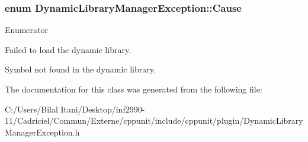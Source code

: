 \subsubsection[{\texorpdfstring{Cause}{Cause}}]{\setlength{\rightskip}{0pt plus 5cm}enum {\bf Dynamic\+Library\+Manager\+Exception\+::\+Cause}}\hypertarget{class_dynamic_library_manager_exception_a73b4694c152e0693fbc19fb04987a0b9}{}\label{class_dynamic_library_manager_exception_a73b4694c152e0693fbc19fb04987a0b9}
\begin{Desc}
\item[Enumerator]\par
\begin{description}
\item[{\em 
loading\+Failed\hypertarget{class_dynamic_library_manager_exception_a73b4694c152e0693fbc19fb04987a0b9a778b42fb996bf018bdc26934649cad63}{}\label{class_dynamic_library_manager_exception_a73b4694c152e0693fbc19fb04987a0b9a778b42fb996bf018bdc26934649cad63}
}]Failed to load the dynamic library. \item[{\em 
symbol\+Not\+Found\hypertarget{class_dynamic_library_manager_exception_a73b4694c152e0693fbc19fb04987a0b9a193fc58bb852e09790da269e2b613045}{}\label{class_dynamic_library_manager_exception_a73b4694c152e0693fbc19fb04987a0b9a193fc58bb852e09790da269e2b613045}
}]Symbol not found in the dynamic library. \end{description}
\end{Desc}


The documentation for this class was generated from the following file\+:\begin{DoxyCompactItemize}
\item 
C\+:/\+Users/\+Bilal Itani/\+Desktop/inf2990-\/11/\+Cadriciel/\+Commun/\+Externe/cppunit/include/cppunit/plugin/Dynamic\+Library\+Manager\+Exception.\+h\end{DoxyCompactItemize}
